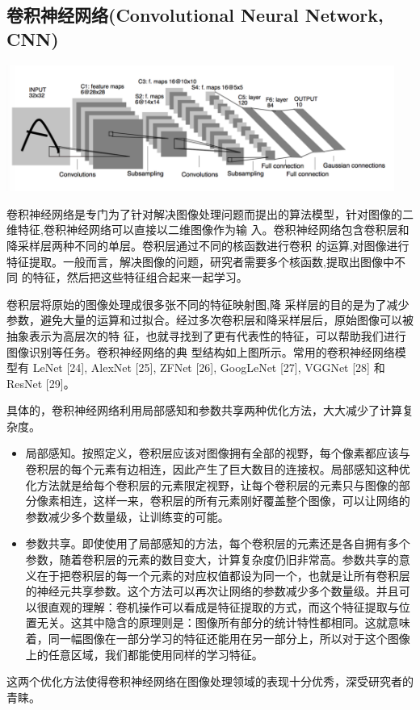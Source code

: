 \subsection{卷积神经网络(Convolutional Neural Network, CNN)}{
	\centerline{\includegraphics[width=5in]{figure/cnn.png}}
	卷积神经网络是专门为了针对解决图像处理问题而提出的算法模型，针对图像的二维特征,卷积神经网络可以直接以二维图像作为输 入。卷积神经网络包含卷积层和降采样层两种不同的单层。卷积层通过不同的核函数进行卷积 的运算,对图像进行特征提取。一般而言，解决图像的问题，研究者需要多个核函数,提取出图像中不同 的特征，然后把这些特征组合起来一起学习。
	
	卷积层将原始的图像处理成很多张不同的特征映射图,降 采样层的目的是为了减少参数，避免大量的运算和过拟合。经过多次卷积层和降采样层后，原始图像可以被抽象表示为高层次的特 征，也就寻找到了更有代表性的特征，可以帮助我们进行图像识别等任务。卷积神经网络的典 型结构如上图所示。常用的卷积神经网络模型有 LeNet [24], AlexNet [25], ZFNet [26], GoogLeNet [27], VGGNet [28] 和 ResNet [29]。
	
	具体的，卷积神经网络利用局部感知和参数共享两种优化方法，大大减少了计算复杂度。
	\begin{itemize}
		\item 局部感知。按照定义，卷积层应该对图像拥有全部的视野，每个像素都应该与卷积层的每个元素有边相连，因此产生了巨大数目的连接权。局部感知这种优化方法就是给每个卷积层的元素限定视野，让每个卷积层的元素只与图像的部分像素相连，这样一来，卷积层的所有元素刚好覆盖整个图像，可以让网络的参数减少多个数量级，让训练变的可能。
		\item 参数共享。即使使用了局部感知的方法，每个卷积层的元素还是各自拥有多个参数，随着卷积层的元素的数目变大，计算复杂度仍旧非常高。参数共享的意义在于把卷积层的每一个元素的对应权值都设为同一个，也就是让所有卷积层的神经元共享参数。这个方法可以再次让网络的参数减少多个数量级。并且可以很直观的理解：卷机操作可以看成是特征提取的方式，而这个特征提取与位置无关。这其中隐含的原理则是：图像所有部分的统计特性都相同。这就意味着，同一幅图像在一部分学习的特征还能用在另一部分上，所以对于这个图像上的任意区域，我们都能使用同样的学习特征。
	\end{itemize}
	这两个优化方法使得卷积神经网络在图像处理领域的表现十分优秀，深受研究者的青睐。
}

